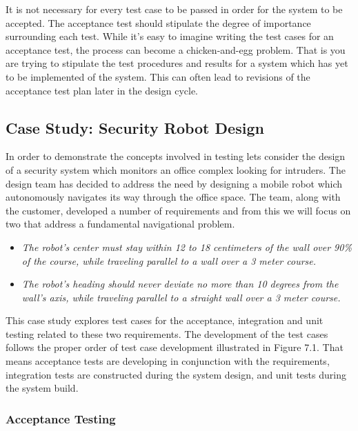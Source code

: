 It is not necessary for every test case to be passed in order for the
system to be accepted. The acceptance test should stipulate the degree
of importance surrounding each test. While it's easy to imagine writing
the test cases for an acceptance test, the process can become a
chicken-and-egg problem. That is you are trying to stipulate the test
procedures and results for a system which has yet to be implemented of
the system. This can often lead to revisions of the acceptance test plan
later in the design cycle.

\subsection{Case Study: Security Robot
Design}\label{case-study-security-robot-design}

In order to demonstrate the concepts involved in testing lets consider
the design of a security system which monitors an office complex looking
for intruders. The design team has decided to address the need by
designing a mobile robot which autonomously navigates its way through
the office space. The team, along with the customer, developed a number
of requirements and from this we will focus on two that address a
fundamental navigational problem.

\begin{itemize}
\item
  \emph{The robot's center must stay within 12 to 18 centimeters of the
  wall over 90\% of the course, while traveling parallel to a wall over
  a 3 meter course.}
\item
  \emph{The robot's heading should never deviate no more than 10 degrees
  from the wall's axis, while traveling parallel to a straight wall over
  a 3 meter course.}
\end{itemize}

This case study explores test cases for the acceptance, integration and
unit testing related to these two requirements. The development of the
test cases follows the proper order of test case development illustrated
in Figure 7.1. That means acceptance tests are developing in conjunction
with the requirements, integration tests are constructed during the
system design, and unit tests during the system build.

\subsubsection*{Acceptance Testing}\label{acceptance-testing-1}

